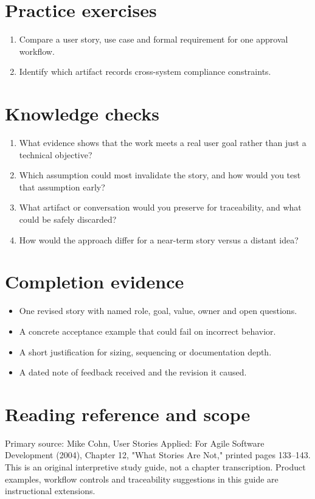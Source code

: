 \documentclass[11pt,letterpaper]{article}
\begin{document}
\section{Practice exercises}
\begin{enumerate}[leftmargin=*,itemsep=3pt]
\item Compare a user story, use case and formal requirement for one approval workflow.
\item Identify which artifact records cross-system compliance constraints.
\end{enumerate}
\section{Knowledge checks}
\begin{enumerate}[leftmargin=*,itemsep=3pt]
\item What evidence shows that the work meets a real user goal rather than just a technical objective?
\item Which assumption could most invalidate the story, and how would you test that assumption early?
\item What artifact or conversation would you preserve for traceability, and what could be safely discarded?
\item How would the approach differ for a near-term story versus a distant idea?
\end{enumerate}
\section{Completion evidence}
\begin{itemize}[leftmargin=*,itemsep=2pt]
\item One revised story with named role, goal, value, owner and open questions.
\item A concrete acceptance example that could fail on incorrect behavior.
\item A short justification for sizing, sequencing or documentation depth.
\item A dated note of feedback received and the revision it caused.
\end{itemize}
\section{Reading reference and scope}
Primary source: Mike Cohn, User Stories Applied: For Agile Software Development (2004), Chapter 12, "What Stories Are Not," printed pages 133–143. This is an original interpretive study guide, not a chapter transcription. Product examples, workflow controls and traceability suggestions in this guide are instructional extensions.
\end{document}
